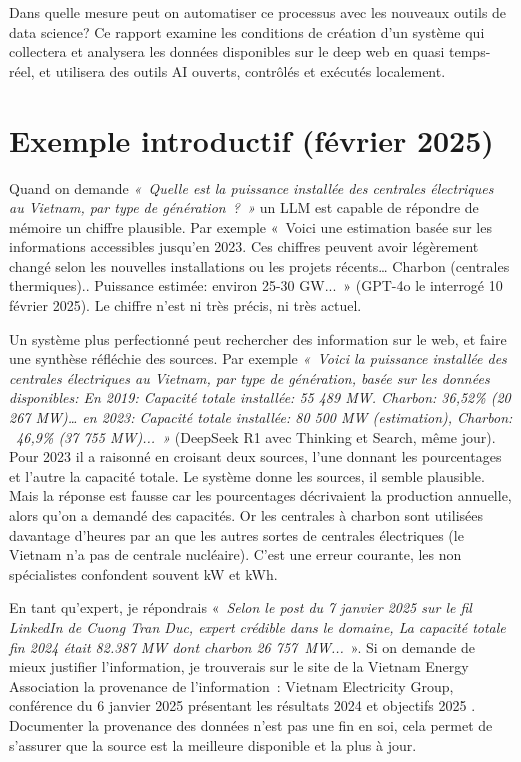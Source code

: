 \documentclass[a4paper,11pt]{report}
\begin{document}
Dans quelle mesure peut on automatiser ce processus avec les nouveaux outils de data science?
Ce rapport examine les conditions de création d'un système qui collectera et analysera les données disponibles sur le deep web en quasi temps-réel, et utilisera des outils AI ouverts, contrôlés et exécutés localement.

\section{Exemple introductif (février 2025)}

Quand on demande \emph{«~Quelle est la puissance installée des centrales électriques au Vietnam, par type de génération~?~»} un LLM est capable de répondre de mémoire un chiffre plausible. Par exemple «~Voici une estimation basée sur les informations accessibles jusqu'en 2023. Ces chiffres peuvent avoir légèrement changé selon les nouvelles installations ou les projets récents\ldots{} Charbon (centrales thermiques).. Puissance estimée: environ 25-30 GW...~» (GPT-4o le interrogé 10 février 2025). Le chiffre n'est ni très précis, ni très actuel.

Un système plus perfectionné peut rechercher des information sur le web, et faire une synthèse réfléchie des sources. Par exemple \emph{«~Voici la puissance installée des centrales électriques au Vietnam, par type de génération, basée sur les données disponibles: En 2019: Capacité totale installée: 55 489 MW. Charbon: 36,52\% (20 267 MW)\ldots{} en 2023: Capacité totale installée: 80 500 MW (estimation), Charbon: ~46,9\% (37 755 MW)...~»} (DeepSeek R1 avec Thinking et Search, même jour). Pour 2023 il a raisonné en croisant deux sources, l'une donnant les pourcentages et l'autre la capacité totale. Le système donne les sources, il semble plausible. Mais la réponse est fausse car les pourcentages décrivaient la production annuelle, alors qu'on a demandé des capacités. Or les centrales à charbon sont utilisées davantage d'heures par an que les autres sortes de centrales électriques (le Vietnam n'a pas de centrale nucléaire). C'est une erreur courante, les non spécialistes confondent souvent kW et kWh.

En tant qu'expert, je répondrais «~\emph{Selon le post du 7 janvier 2025 sur le fil LinkedIn de Cuong Tran Duc, expert crédible dans le domaine, La capacité totale fin 2024 était 82.387 MW dont charbon 26 757~MW...}~». Si on demande de mieux justifier l'information, je trouverais sur le site de la Vietnam Energy Association la provenance de l'information~: Vietnam Electricity Group, conférence du 6 janvier 2025 présentant les résultats 2024 et objectifs 2025 \citep{DVW38BYR}. Documenter la provenance des données n'est pas une fin en soi, cela permet de s'assurer que la source est la meilleure disponible et la plus à jour.
\end{document}
